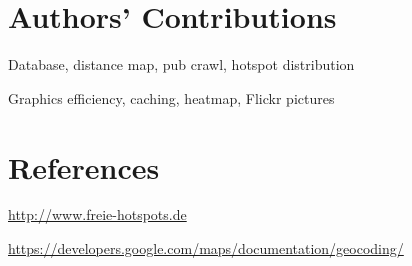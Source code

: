 \section*{Authors' Contributions}

\begin{description}
\setlength{\itemsep}{0pt}
  \item[Andreas Ergenzinger] Database, distance map, pub crawl, hotspot distribution
  \item[Josua Krause] Graphics efficiency, caching, heatmap, Flickr pictures
\end{description}

\section*{References}

\begin{description}
\setlength{\itemsep}{0pt}
\item[Wi-Fi Positions.]
  \url{http://www.freie-hotspots.de}
\item[Google Geocoding API.]
  \url{https://developers.google.com/maps/documentation/geocoding/}
\end{description}
